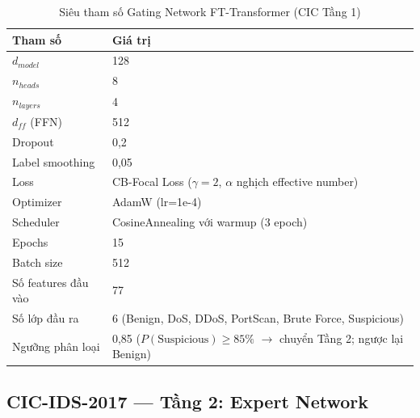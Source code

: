 \documentclass[../DoAn.tex]{subfiles}
\begin{document}
\begin{table}[H]
    \centering
    \caption{Siêu tham số Gating Network FT-Transformer (CIC Tầng 1)}
    \label{tab:hyp-gating}
    \begin{tabular}{ll}
        \hline
        \textbf{Tham số} & \textbf{Giá trị} \\
        \hline
        $d_{model}$ & 128 \\
        $n_{heads}$ & 8 \\
        $n_{layers}$ & 4 \\
        $d_{ff}$ (FFN) & 512 \\
        Dropout & 0,2 \\
        Label smoothing & 0,05 \\
        Loss & CB-Focal Loss ($\gamma=2$, $\alpha$ nghịch effective number) \\
        Optimizer & AdamW (lr=1e-4) \\
        Scheduler & CosineAnnealing với warmup (3 epoch) \\
        Epochs & 15 \\
        Batch size & 512 \\
        Số features đầu vào & 77 \\
        Số lớp đầu ra & 6 (Benign, DoS, DDoS, PortScan, Brute Force, Suspicious) \\
        Ngưỡng phân loại & 0,85 ($P(\text{Suspicious}) \geq 85\%$ $\to$ chuyển Tầng 2; ngược lại Benign) \\
        \hline
    \end{tabular}
\end{table}

\subsection{CIC-IDS-2017 --- Tầng 2: Expert Network}
\end{document}
